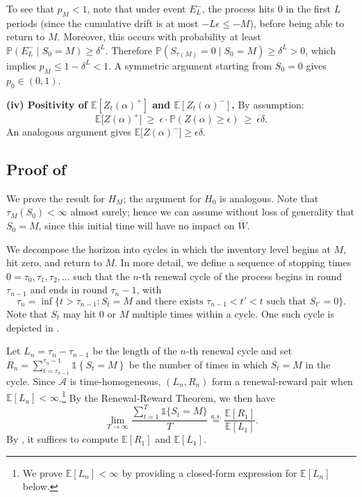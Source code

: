 \documentclass[mnsc,nonblindrev]{informs3}
\newcommand{\E}{\mathbb{E}}
\newcommand{\pr}{\mathbb{P}}
\renewcommand{\Pr}{\pr}
\newcommand{\policy}{\mathcal{A}}
\newcommand{\ind}[1]{\mathds{1}\left\{#1\right\}}
\newcommand{\Exp}[1]{\mathbb{E} \left[ #1 \right]} %
\renewenvironment{proof}[1][Proof]{%
  \par\noindent{\itshape #1.} \ignorespaces
}{%
  \hfill\Halmos\par
}
\begin{document}
\begin{APPENDICES}
\begin{proof}
To see that $p_M<1$, note that under event $E^-_L$, the process hits 0 in the first $L$ periods (since the cumulative drift is at most $-L\epsilon \leq -M$), before being able to return to $M$. Moreover, this occurs with probability at least
$\Pr(E^-_L\mid S_0=M)\ge \delta^L$.
Therefore $\Pr(S_{\tau(M)}=0\mid S_0=M)\ge \delta^L>0$, which implies $p_M\le 1-\delta^L<1$.
A symmetric argument starting from $S_0=0$ gives $p_0\in(0,1)$.

\medskip
\noindent\textbf{(iv) Positivity of $\Exp{Z_t(\alpha)^+}$ and $\Exp{Z_t(\alpha)^-}$.}
By assumption:
\[
\mathbb{E}\big[ Z(\alpha)^+ \big] 
\ \ge\ \epsilon \cdot \Pr(Z(\alpha) \geq \epsilon) 
\ \ge\ \epsilon \delta.
\]
An analogous argument gives $\mathbb{E}\big[ Z(\alpha)^- \big] \ge \epsilon\delta$.  
\end{proof}

\subsection{Proof of }\label{apx:h-thm}

\InefficiencyExpression*
\begin{proof}
We prove the result for $H_M$; the argument for $H_0$ is analogous. Note that $\tau_M(S_0) < \infty$ almost surely; hence we can assume without loss of generality that $S_0 = M$, since this initial time will have no impact on $\overline{W}$.


We decompose the horizon into cycles in which the inventory level begins at $M$, hit zero, and return to $M$.
In more detail, we define a sequence of stopping times $0 = \tau_0,\tau_1,\tau_2,\ldots$ such that the $n$-th renewal cycle of the process begins in round $\tau_{n-1}$ and ends in round $\tau_n-1$, with
\[\tau_n = \inf\{t > \tau_{n-1}: S_t = M \text{ and there exists } \tau_{n-1} < t' < t \text{ such that } S_{t'} = 0\}.\]
Note that $S_t$ may hit 0 or $M$ multiple times within a cycle. One such cycle is depicted in .

Let $L_n = \tau_{n} - \tau_{n-1}$ be the length of the $n$-th renewal cycle and set $R_n = \sum_{t=\tau_{n-1}}^{\tau_n-1} \ind{S_t = M}$ be the number of times in which $S_t = M$ in the cycle. Since $\policy$ is time-homogeneous, 
$(L_n, R_n)$ form a renewal-reward pair when $\mathbb{E}[L_n] < \infty$.\footnote{We prove $\mathbb{E}[L_n] < \infty$ by providing a closed-form expression for $\Exp{L_n}$ below.}
By the Renewal-Reward Theorem, we then have
\begin{equation}\label{eq:renewal-reward_expression_appx}
    \lim_{T \rightarrow \infty}\frac{\sum_{t=1}^T\mathds{1}\{S_t = M\}}{T} \stackrel{a.s.}{=} \frac{\E[R_1]}{\E[L_1]}.
\end{equation} 
By , it suffices to compute $\E[R_1]$ and $\E[L_1]$. 


\end{proof}
\end{APPENDICES}
\end{document}
